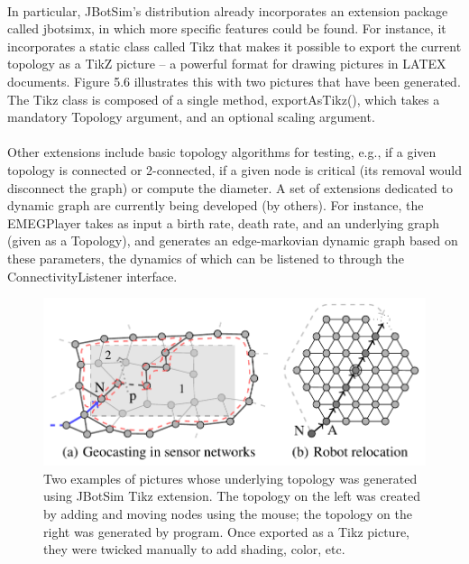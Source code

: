 \paragraph{}In particular, JBotSim’s distribution already incorporates an extension package called jbotsimx, in which more specific features could be found. For instance, it incorporates a static class called Tikz that makes it possible to export the current topology as a TikZ picture – a powerful format for drawing pictures in LATEX documents. Figure 5.6 illustrates this with two pictures that have been generated. The Tikz class is composed of a single method, exportAsTikz(), which takes a mandatory Topology argument, and an optional scaling argument.
\paragraph{}Other extensions include basic topology algorithms for testing, e.g., if a given topology is connected or 2-connected, if a given node is critical (its removal would disconnect the graph) or compute the diameter. A set of extensions dedicated to dynamic graph are currently being developed (by others). For instance, the EMEGPlayer takes as input a birth rate, death rate, and an underlying graph (given as a Topology), and generates an edge-markovian dynamic graph based on these parameters, the dynamics of which can be listened to through the ConnectivityListener interface.

\begin{figure}[h]
	\centering
	\includegraphics[width=0.7\linewidth]{fig_7}
	\caption[Two examples of pictures whose underlying topology was generated using JBotSim Tikz extension.]{Two examples of pictures whose underlying topology was generated using JBotSim Tikz extension. The topology on the left was created by adding and moving nodes using the mouse; the topology on the right was generated by program. Once exported as a Tikz picture, they were twicked manually to add shading, color, etc.}
	\label{fig:fig7}
\end{figure}

